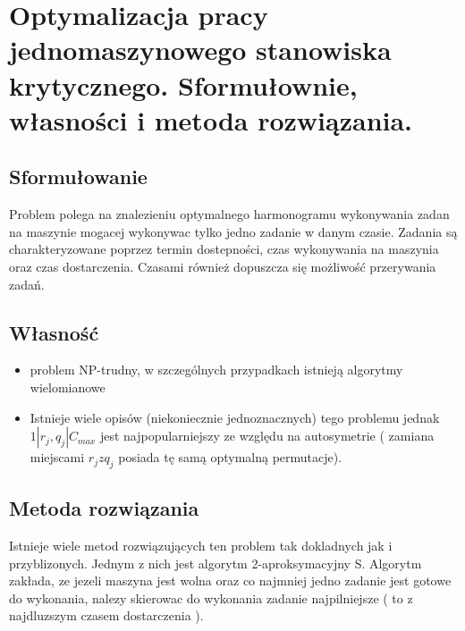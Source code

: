 \section{Optymalizacja pracy jednomaszynowego stanowiska krytycznego. Sformułownie, własności i metoda rozwiązania.}
\subsection{Sformułowanie}
Problem polega na znalezieniu optymalnego harmonogramu wykonywania zadan na maszynie mogacej wykonywac tylko jedno zadanie w danym czasie. Zadania są charakteryzowane poprzez termin dostepności, czas wykonywania na maszynia oraz czas dostarczenia. Czasami również dopuszcza się możliwość przerywania zadań.
\subsection{Własność}
\begin{itemize}
\item problem NP-trudny, w szczególnych przypadkach istnieją algorytmy wielomianowe
\item Istnieje wiele opisów (niekoniecznie jednoznacznych) tego problemu jednak $1|r_j,q_j|C_{max}$  jest najpopularniejszy ze względu na autosymetrie ( zamiana miejscami $r_j z q_j$ posiada tę samą optymalną permutacje).
\end{itemize}
\subsection{Metoda rozwiązania}
Istnieje wiele metod rozwiązujących ten problem tak dokladnych jak i przyblizonych. Jednym z nich jest algorytm 2-aproksymacyjny S. Algorytm zakłada, ze jezeli maszyna jest wolna oraz co najmniej jedno zadanie jest gotowe do wykonania, nalezy skierowac do wykonania zadanie najpilniejsze ( to z najdluzszym czasem dostarczenia ).